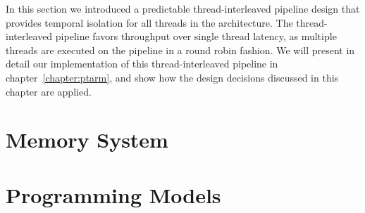 In this section we introduced a predictable thread-interleaved pipeline design that provides temporal isolation for all threads in the architecture.
The thread-interleaved pipeline favors throughput over single thread latency, as multiple threads are executed on the pipeline in a round robin fashion.  
We will present in detail our implementation of this thread-interleaved pipeline in chapter~\ref{chapter:ptarm}, and show how the design decisions discussed in this chapter are applied.

\section{Memory System}
\label{section:memory_system}


\section{Programming Models}
\label{chapter:programming_models}

